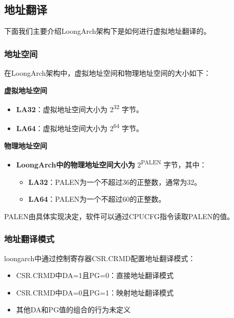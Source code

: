 \subsection{地址翻译}\label{sec:10-mmu-013}

下面我们主要介绍LoongArch架构下是如何进行虚拟地址翻译的。

\subsubsection{地址空间}\label{sec:10-mmu-014}

在LoongArch架构中，虚拟地址空间和物理地址空间的大小如下：

\textbf{虚拟地址空间}

\begin{itemize}
\tightlist
\item
  \textbf{LA32}：虚拟地址空间大小为 2\textsuperscript{32} 字节。
\item
  \textbf{LA64}：虚拟地址空间大小为 2\textsuperscript{64} 字节。
\end{itemize}

\textbf{物理地址空间}

\begin{itemize}
\tightlist
\item
  \textbf{LoongArch中的物理地址空间大小为} 2\textsuperscript{PALEN} 字节，其中：

  \begin{itemize}
  \tightlist
  \item
    \textbf{LA32}：PALEN为一个不超过36的正整数，通常为32。
  \item
    \textbf{LA64}：PALEN为一个不超过60的正整数。
  \end{itemize}
\end{itemize}

PALEN由具体实现决定，软件可以通过CPUCFG指令读取PALEN的值。

\subsubsection{地址翻译模式}\label{sec:10-mmu-015}

loongarch中通过控制寄存器CSR.CRMD配置地址翻译模式：

\begin{itemize}
\tightlist
\item
  CSR.CRMD中DA=1且PG=0：直接地址翻译模式
\item
  CSR.CRMD中DA=0且PG=1：映射地址翻译模式
\item
  其他DA和PG值的组合的行为未定义
\end{itemize}

